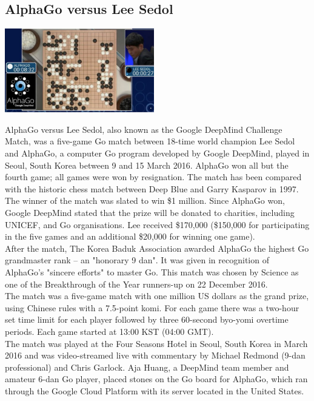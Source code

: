 \documentclass[11pt]{report}
\begin{document}
\subsection{AlphaGo versus Lee Sedol}
\vspace{2mm}\begin{center}\includegraphics[width=6.5cm]{./img/alphaGo.jpg}\end{center}
AlphaGo versus Lee Sedol, also known as the Google DeepMind Challenge Match, was a five-game Go match between 18-time world champion Lee Sedol and AlphaGo, a computer Go program developed by Google DeepMind, played in Seoul, South Korea between 9 and 15 March 2016. AlphaGo won all but the fourth game; all games were won by resignation. The match has been compared with the historic chess match between Deep Blue and Garry Kasparov in 1997.\\ \indent The winner of the match was slated to win \$1 million. Since AlphaGo won, Google DeepMind stated that the prize will be donated to charities, including UNICEF, and Go organisations. Lee received \$170,000 (\$150,000 for participating in the five games and an additional \$20,000 for winning one game).\\
\indent After the match, The Korea Baduk Association awarded AlphaGo the highest Go grandmaster rank – an "honorary 9 dan". It was given in recognition of AlphaGo's "sincere efforts" to master Go. This match was chosen by Science as one of the Breakthrough of the Year runners-up on 22 December 2016.\\
\indent The match was a five-game match with one million US dollars as the grand prize, using Chinese rules with a 7.5-point komi. For each game there was a two-hour set time limit for each player followed by three 60-second byo-yomi overtime periods. Each game started at 13:00 KST (04:00 GMT).\\
\indent The match was played at the Four Seasons Hotel in Seoul, South Korea in March 2016 and was video-streamed live with commentary by Michael Redmond (9-dan professional) and Chris Garlock. Aja Huang, a DeepMind team member and amateur 6-dan Go player, placed stones on the Go board for AlphaGo, which ran through the Google Cloud Platform with its server located in the United States.
\end{document}
